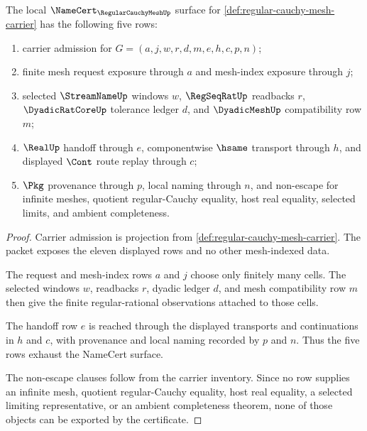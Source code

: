 \begin{theorem}
\label{thm:regular-cauchy-mesh-namecert-obligation-sketch}
The local $\NameCert_{\RegularCauchyMeshUp}$ surface for \autoref{def:regular-cauchy-mesh-carrier} has the following five rows:
\begin{enumerate}
\item carrier admission for $G=(a,j,w,r,d,m,e,h,c,p,n)$;
\item finite mesh request exposure through $a$ and mesh-index exposure through $j$;
\item selected $\StreamNameUp$ windows $w$, $\RegSeqRatUp$ readbacks $r$, $\DyadicRatCoreUp$ tolerance ledger $d$, and $\DyadicMeshUp$ compatibility row $m$;
\item $\RealUp$ handoff through $e$, componentwise $\hsame$ transport through $h$, and displayed $\Cont$ route replay through $c$;
\item $\Pkg$ provenance through $p$, local naming through $n$, and non-escape for infinite meshes, quotient regular-Cauchy equality, host real equality, selected limits, and ambient completeness.
\end{enumerate}
\end{theorem}
\begin{proof}
Carrier admission is projection from \autoref{def:regular-cauchy-mesh-carrier}. The packet exposes the eleven displayed rows and no other mesh-indexed data.

The request and mesh-index rows $a$ and $j$ choose only finitely many cells. The selected windows $w$, readbacks $r$, dyadic ledger $d$, and mesh compatibility row $m$ then give the finite regular-rational observations attached to those cells.

The handoff row $e$ is reached through the displayed transports and continuations in $h$ and $c$, with provenance and local naming recorded by $p$ and $n$. Thus the five rows exhaust the NameCert surface.

The non-escape clauses follow from the carrier inventory. Since no row supplies an infinite mesh, quotient regular-Cauchy equality, host real equality, a selected limiting representative, or an ambient completeness theorem, none of those objects can be exported by the certificate.
\end{proof}


